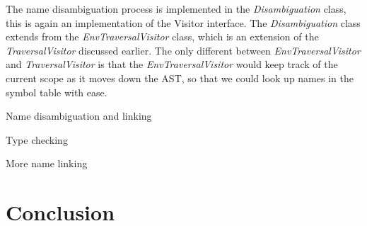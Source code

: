 \documentclass[a4paper, notitlepage]{report}
\begin{document}
The name disambiguation process is implemented in the \emph{Disambiguation} class, this is again an implementation of the Visitor interface. The \emph{Disambiguation} class extends from the \emph{EnvTraversalVisitor} class, which is an extension of the \emph{TraversalVisitor} discussed earlier. The only different between \emph{EnvTraversalVisitor} and \emph{TraversalVisitor} is that the \emph{EnvTraversalVisitor} would keep track of the current scope as it moves down the AST, so that we could look up names in the symbol table with ease.   

Name disambiguation and linking

Type checking

More name linking







\chapter{Conclusion}



\end{document}
